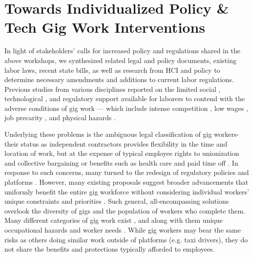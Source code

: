 \chapter{Towards Individualized Policy \& Tech Gig Work Interventions} \label{4individualized}
In light of stakeholders' calls for increased policy and regulations shared in the above workshops, we synthesized related legal and policy documents, existing labor laws, recent state bills, as well as research from HCI and policy to determine necessary amendments and additions to current labor regulations.
Previous studies from various disciplines reported on the limited social \cite{atom,kuhn2019expanding,commodified}, technological \cite{chiworkli,platform_manage}, and regulatory \cite{Dubal2019-qi,Hardy2022-xd,Graham2017-zw,Tan2021-li,regulating} support available for laborers to contend with the adverse conditions of gig work --- which include intense competition \cite{bates2021lessons,boundary}, low wages \cite{xe4p,Kalleberg_undated-sb,good}, job precarity \cite{Ashford2018-dw,precarity}, and physical hazards \cite{rc6G,Howard2017-wd}. 

Underlying these problems is the ambiguous legal classification of gig workers-their status as independent contractors provides flexibility in the time and location of work, but at the expense of typical employee rights to unionization and collective bargaining or benefits such as health care and paid time off \cite{category}. In response to such concerns, many turned to the redesign of regulatory policies \cite{regulate, regulating} and platforms \cite{arnoldi2021mapping,Jabagi2019-dt}. However, many existing proposals suggest broader advancements that uniformly benefit the entire gig workforce without considering individual workers' unique constraints and priorities \cite{codesign}. Such general, all-encompassing solutions overlook the diversity of gigs and the population of workers who complete them. Many different categories of gig work exist \cite{Duggan2020-qh}, and along with them unique occupational hazards and worker needs  \cite{rc6G}. While gig workers may bear the same risks as others doing similar work outside of platforms (e.g. taxi drivers), they do not share the benefits and protections typically afforded to employees. 

